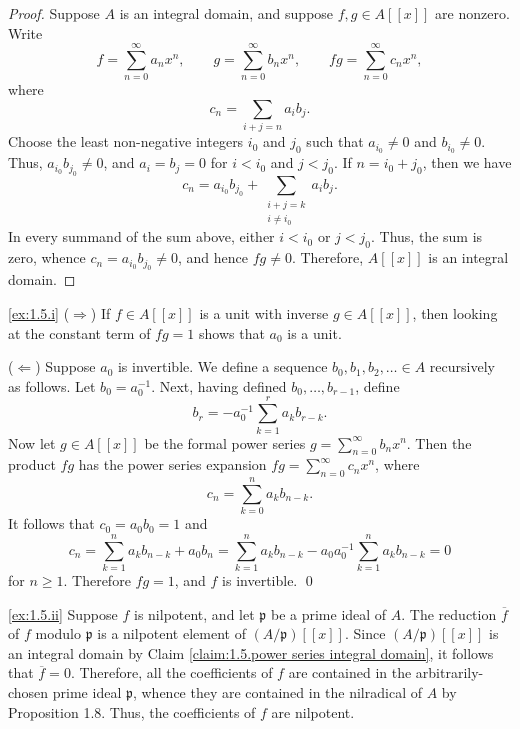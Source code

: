 \begin{proof}
Suppose $A$ is an integral domain, and suppose $f,g\in A[[x]]$ are nonzero.
Write
\begin{equation*}
f = \sum_{n=0}^\infty a_n x^n,
\qquad
g = \sum_{n=0}^\infty b_n x^n,
\qquad
f g = \sum_{n=0}^\infty c_n x^n,
\end{equation*}
where
\begin{equation*}
c_n = \sum_{i + j = n} a_i b_j.
\end{equation*}
Choose the least non-negative integers $i_0$ and $j_0$ such that $a_{i_0} \neq 0$ and $b_{i_0} \neq 0$.
Thus, $a_{i_0} b_{j_0} \neq 0$, and $a_i = b_j = 0$ for $i < i_0$ and $j < j_0$.
If $n = i_0 + j_0$, then we have
\begin{equation*}
c_n = a_{i_0} b_{j_0} + \sum_{\substack{i + j = k \\ i \neq i_0}} a_i b_j.
\end{equation*}
In every summand of the sum above, either $i < i_0$ or $j < j_0$.
Thus, the sum is zero, whence $c_n = a_{i_0} b_{j_0} \neq 0$, and hence $f g \neq 0$.
Therefore, $A[[x]]$ is an integral domain.
\end{proof}

\noindent
\ref{ex:1.5.i}
($\Rightarrow$)
If $f\in A[[x]]$ is a unit with inverse $g\in A[[x]]$, then looking at the constant term of $f g = 1$ shows that $a_0$ is a unit.

($\Leftarrow$)
Suppose $a_0$ is invertible.
We define a sequence $b_0,b_1,b_2,\ldots \in A$ recursively as follows.
Let $b_0 = a_0^{-1}$.
Next, having defined $b_0,\ldots,b_{r-1}$, define
\begin{equation*}
b_r = -a_0^{-1}\sum_{k=1}^r a_k b_{r-k}.
\end{equation*}
Now let $g \in A[[x]]$ be the formal power series $g = \sum_{n=0}^\infty b_n x^n$.
Then the product $f g$ has the power series expansion $f g = \sum_{n=0}^\infty c_n x^n$, where
\begin{equation*}
c_n = \sum_{k=0}^n a_k b_{n-k}.
\end{equation*}
It follows that $c_0 = a_0 b_0 = 1$ and
\begin{equation*}
c_n
= \sum_{k=1}^n a_k b_{n-k} + a_0 b_n
= \sum_{k=1}^n a_k b_{n-k} - a_0 a_0^{-1} \sum_{k=1}^n a_k b_{n-k}
= 0
\end{equation*}
for $n \geq 1$.
Therefore $f g = 1$, and $f$ is invertible.
\qed




\noindent
\ref{ex:1.5.ii}
Suppose $f$ is nilpotent, and let $\mathfrak p$ be a prime ideal of $A$.
The reduction $\overline f$ of $f$ modulo $\mathfrak p$ is a nilpotent element of $(A/\mathfrak p)[[x]]$.
Since $(A/\mathfrak p)[[x]]$ is an integral domain by Claim \ref{claim:1.5.power series integral domain}, it follows that $\overline f = 0$.
Therefore, all the coefficients of $f$ are contained in the arbitrarily-chosen prime ideal $\mathfrak p$, whence they are contained in the nilradical of $A$ by Proposition 1.8.
Thus, the coefficients of $f$ are nilpotent.

